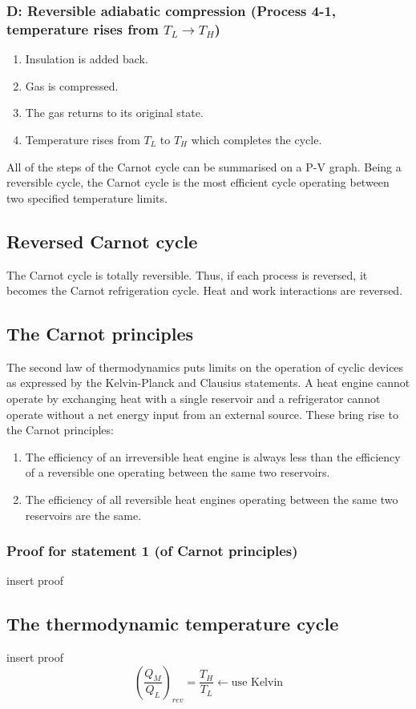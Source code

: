 \documentclass[class=report, crop=false, 12pt,a4paper]{standalone}
\begin{document}
\subsubsection{D: Reversible adiabatic compression (Process 4-1, temperature rises from $T_L \rightarrow T_H$)}
\begin{enumerate}[noitemsep]
  \item Insulation is added back.
  \item Gas is compressed.
  \item The gas returns to its original state.
  \item Temperature rises from $T_L$ to $T_H$ which completes the cycle.
\end{enumerate}
All of the steps of the Carnot cycle can be summarised on a P-V graph. Being a reversible cycle, the Carnot cycle is the most efficient cycle operating between two specified temperature limits.
\subsection{Reversed Carnot cycle}
The Carnot cycle is totally reversible. Thus, if each process is reversed, it becomes the Carnot refrigeration cycle. Heat and work interactions are reversed. 
\subsection{The Carnot principles}
The second law of thermodynamics puts limits on the operation of cyclic devices as expressed by the Kelvin-Planck and Clausius statements. A heat engine cannot operate by exchanging heat with a single reservoir and a refrigerator cannot operate without a net energy input from an external source. These bring rise to the Carnot principles:
\begin{enumerate}[noitemsep]
  \item The efficiency of an irreversible heat engine is always less than the efficiency of a reversible one operating between the same two reservoirs.
  \item The efficiency of all reversible heat engines operating between the same two reservoirs are the same.
\end{enumerate}
\subsubsection{Proof for statement 1 (of Carnot principles)}
insert proof
\subsection{The thermodynamic temperature cycle}
insert proof
\begin{equation} 
  \left( \frac{Q_M}{Q_L} \right)_{rev} = \frac{T_H}{T_L} \leftarrow \textrm{use Kelvin} 
\end{equation}
\end{document}
